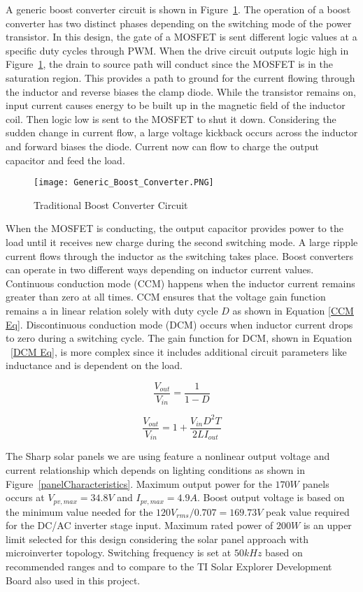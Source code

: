 A generic boost converter circuit is shown in Figure~\ref{genericBoost}. The operation of a boost converter has two distinct phases depending on the switching mode of the power transistor. In this design, the gate of a MOSFET is sent different logic values at a specific duty cycles through PWM. When the drive circuit outputs logic high in Figure~\ref{genericBoost}, the drain to source path will conduct since the MOSFET is in the saturation region. This provides a path to ground for the current flowing through the inductor and reverse biases the clamp diode. While the transistor remains on, input current causes energy to be built up in the magnetic field of the inductor coil. Then logic low is sent to the MOSFET to shut it down. Considering the sudden change in current flow, a large voltage kickback occurs across the inductor and forward biases the diode. Current now can flow to charge the output capacitor and feed the load.

\begin{figure}
\centering
\texttt{[image: Generic\_Boost\_Converter.PNG]}
\caption{Traditional Boost Converter Circuit}
\label{genericBoost}
\end{figure}

When the MOSFET is conducting, the output capacitor provides power to the load until it receives new charge during the second switching mode. A large ripple current flows through the inductor as the switching takes place. Boost converters can operate in two different ways depending on inductor current values. Continuous conduction mode (CCM) happens when the inductor current remains greater than zero at all times. CCM ensures that the voltage gain function remains a in linear relation solely with duty cycle $D$ as shown in Equation \ref{CCM Eq}. Discontinuous conduction mode (DCM) occurs when inductor current drops to zero during a switching cycle. The gain function for DCM, shown in Equation ~\ref{DCM Eq}, is more complex since it includes additional circuit parameters like inductance and is dependent on the load. 

\begin{equation}
\frac{V_{out}}{V_{in}} =  \frac{1}{1-D}
\label{CCM Eq}
\end{equation}   

\begin{equation}
\frac{V_{out}}{V_{in}} = 1 + \frac{V_{in}D^2T}{2LI_{out}}
\label{DCM Eq}
\end{equation}

The Sharp solar panels we are using feature a nonlinear output voltage and current relationship which depends on lighting conditions as shown in Figure~\ref{panelCharacteristics}. Maximum output power for the $170W$ panels occurs at $V_{pv,max}=34.8V$ and  $I_{pv,max} = 4.9A$. Boost output voltage is based on the minimum value needed for the $120V_{rms}/0.707 = 169.73V$ peak value required for the DC/AC inverter stage input. Maximum rated power of $200W$ is an upper limit selected for this design considering the solar panel approach with microinverter topology. Switching frequency is set at $50 kHz$ based on recommended ranges and to compare to the TI Solar Explorer Development Board also used in this project.\cite{SharpPanel}


